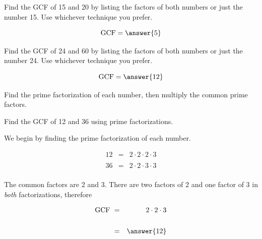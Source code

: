 \documentclass{ximera}[font=12pt]  %
\begin{document}
\begin{problem}
Find the GCF of 15 and 20 by listing the factors of both numbers or just the number 15.  Use whichever technique you prefer.

\[ \textrm{GCF} = \answer{5} \]

\end{problem}


\begin{problem}
Find the GCF of 24 and 60 by listing the factors of both numbers or just the number 24.  Use whichever technique you prefer.

\[ \textrm{GCF} = \answer{12} \]

\end{problem}


\begin{procedure}
    
    Find the prime factorization of each number, then multiply the common prime factors.  
    
\end{procedure}

\begin{example}

Find the GCF of 12 and 36 using prime factorizations. 

\begin{explanation}

We begin by finding the prime factorization of each number.

\begin{eqnarray*}
12 &=& 2 \cdot 2 \cdot 2 \cdot 3 \\
   & & \\
36 &=& 2 \cdot 2 \cdot 3 \cdot 3 \\
\end{eqnarray*}

The common factors are 2 and 3.  There are two factors of 2 and one factor of 3 in \textit{both} factorizations, therefore

\begin{eqnarray*}
\textrm{GCF} \  &=& 2 \cdot 2 \cdot 3 \\
   & & \\
   &=& \answer{12} \\
\end{eqnarray*}


\end{explanation}
\end{example}
\end{document}
